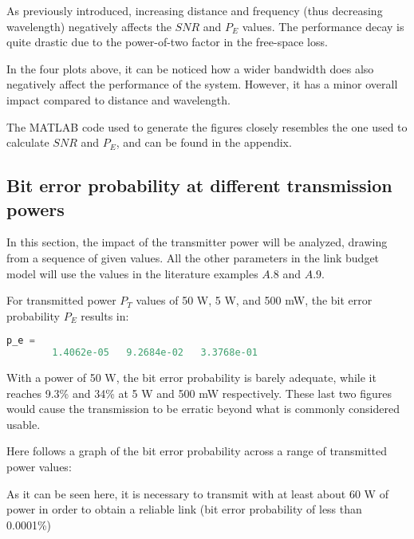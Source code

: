 
As previously introduced, increasing distance and frequency (thus decreasing wavelength) negatively affects the $SNR$ and $P_E$ values.
The performance decay is quite drastic due to the power-of-two factor in the free-space loss.



In the four plots above, it can be noticed how a wider bandwidth does also negatively affect the performance of the system.
However, it has a minor overall impact compared to distance and wavelength.

The MATLAB code used to generate the figures closely resembles the one used to calculate $SNR$ and $P_E$, and can be found in the appendix.


\subsection{Bit error probability at different transmission powers}
In this section, the impact of the transmitter power will be analyzed, drawing from a sequence of given values.
All the other parameters in the link budget model will use the values in the literature examples $A.8$ and $A.9$.

For transmitted power $P_T$ values of 50 W, 5 W, and 500 mW, the bit error probability $P_E$ results in:

\begin{lstlisting}[language=Octave]
    p_e =
        1.4062e-05   9.2684e-02   3.3768e-01
\end{lstlisting}

With a power of 50 W, the bit error probability is barely adequate, while it reaches 9.3\% and 34\% at 5 W and 500  mW respectively.
These last two figures would cause the transmission to be erratic beyond what is commonly considered usable.

Here follows a graph of the bit error probability across a range of transmitted power values:


As it can be seen here, it is necessary to transmit with at least about 60 W of power in order to obtain a reliable link (bit error probability of less than 0.0001\%)


